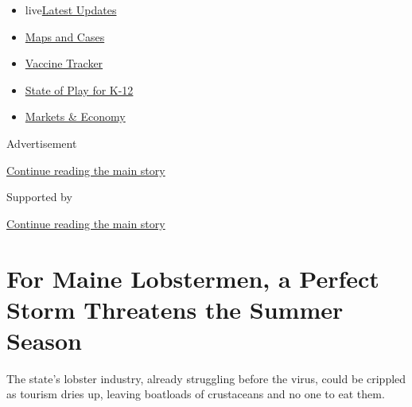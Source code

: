 \begin{itemize}
\tightlist
\item
  live\href{https://www.nytimes.com/2020/08/17/world/coronavirus-covid.html?name=styln-coronavirus-national\&region=TOP_BANNER\&variant=undefined\&block=storyline_menu_recirc\&action=click\&pgtype=Article\&impression_id=ef86ad41-e0d8-11ea-b4e1-3741ed039afc}{Latest
  Updates}
\item
  \href{https://www.nytimes.com/interactive/2020/us/coronavirus-us-cases.html?name=styln-coronavirus-national\&region=TOP_BANNER\&variant=undefined\&block=storyline_menu_recirc\&action=click\&pgtype=Article\&impression_id=ef86ad42-e0d8-11ea-b4e1-3741ed039afc}{Maps
  and Cases}
\item
  \href{https://www.nytimes.com/interactive/2020/science/coronavirus-vaccine-tracker.html?name=styln-coronavirus-national\&region=TOP_BANNER\&variant=undefined\&block=storyline_menu_recirc\&action=click\&pgtype=Article\&impression_id=ef86ad43-e0d8-11ea-b4e1-3741ed039afc}{Vaccine
  Tracker}
\item
  \href{https://www.nytimes.com/2020/08/17/us/k-12-schools-reopening.html?name=styln-coronavirus-national\&region=TOP_BANNER\&variant=undefined\&block=storyline_menu_recirc\&action=click\&pgtype=Article\&impression_id=ef86ad44-e0d8-11ea-b4e1-3741ed039afc}{State
  of Play for K-12}
\item
  \href{https://www.nytimes.com/live/2020/08/17/business/stock-market-today-coronavirus?name=styln-coronavirus-national\&region=TOP_BANNER\&variant=undefined\&block=storyline_menu_recirc\&action=click\&pgtype=Article\&impression_id=ef86d450-e0d8-11ea-b4e1-3741ed039afc}{Markets
  \& Economy}
\end{itemize}

Advertisement

\protect\hyperlink{after-top}{Continue reading the main story}

Supported by

\protect\hyperlink{after-sponsor}{Continue reading the main story}

\hypertarget{for-maine-lobstermen-a-perfect-storm-threatens-the-summer-season}{%
\section{For Maine Lobstermen, a Perfect Storm Threatens the Summer
Season}\label{for-maine-lobstermen-a-perfect-storm-threatens-the-summer-season}}

The state's lobster industry, already struggling before the virus, could
be crippled as tourism dries up, leaving boatloads of crustaceans and no
one to eat them.

